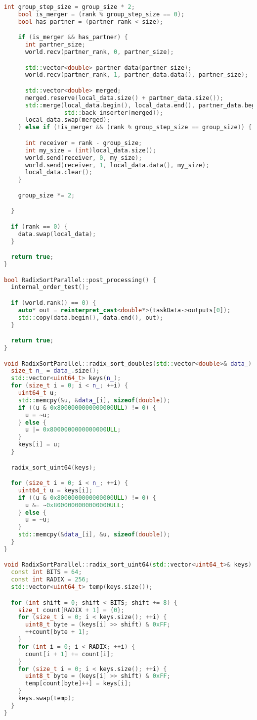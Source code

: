 \documentclass[a4paper,12pt]{article}
\begin{document}
\begin{lstlisting}[language=C++, caption={Реализация параллельной поразрядной сортировки с использованием MPI}]
    int group_step_size = group_size * 2;
    bool is_merger = (rank % group_step_size == 0); 
    bool has_partner = (partner_rank < size);

    if (is_merger && has_partner) {
      int partner_size;
      world.recv(partner_rank, 0, partner_size);

      std::vector<double> partner_data(partner_size);
      world.recv(partner_rank, 1, partner_data.data(), partner_size);

      std::vector<double> merged;
      merged.reserve(local_data.size() + partner_data.size());
      std::merge(local_data.begin(), local_data.end(), partner_data.begin(), partner_data.end(),
                 std::back_inserter(merged));
      local_data.swap(merged);
    } else if (!is_merger && (rank % group_step_size == group_size)) {

      int receiver = rank - group_size;
      int my_size = (int)local_data.size();
      world.send(receiver, 0, my_size);
      world.send(receiver, 1, local_data.data(), my_size);
      local_data.clear();
    }

    group_size *= 2;

  }

  if (rank == 0) {
    data.swap(local_data);
  }

  return true;
}

bool RadixSortParallel::post_processing() {
  internal_order_test();

  if (world.rank() == 0) {
    auto* out = reinterpret_cast<double*>(taskData->outputs[0]);
    std::copy(data.begin(), data.end(), out);
  }

  return true;
}

void RadixSortParallel::radix_sort_doubles(std::vector<double>& data_) {
  size_t n_ = data_.size();
  std::vector<uint64_t> keys(n_);
  for (size_t i = 0; i < n_; ++i) {
    uint64_t u;
    std::memcpy(&u, &data_[i], sizeof(double));
    if ((u & 0x8000000000000000ULL) != 0) {
      u = ~u;
    } else {
      u |= 0x8000000000000000ULL;
    }
    keys[i] = u;
  }

  radix_sort_uint64(keys);

  for (size_t i = 0; i < n_; ++i) {
    uint64_t u = keys[i];
    if ((u & 0x8000000000000000ULL) != 0) {
      u &= ~0x8000000000000000ULL;
    } else {
      u = ~u;
    }
    std::memcpy(&data_[i], &u, sizeof(double));
  }
}

void RadixSortParallel::radix_sort_uint64(std::vector<uint64_t>& keys) {
  const int BITS = 64;
  const int RADIX = 256;
  std::vector<uint64_t> temp(keys.size());

  for (int shift = 0; shift < BITS; shift += 8) {
    size_t count[RADIX + 1] = {0};
    for (size_t i = 0; i < keys.size(); ++i) {
      uint8_t byte = (keys[i] >> shift) & 0xFF;
      ++count[byte + 1];
    }
    for (int i = 0; i < RADIX; ++i) {
      count[i + 1] += count[i];
    }
    for (size_t i = 0; i < keys.size(); ++i) {
      uint8_t byte = (keys[i] >> shift) & 0xFF;
      temp[count[byte]++] = keys[i];
    }
    keys.swap(temp);
  }
}

\end{lstlisting}
\end{document}
